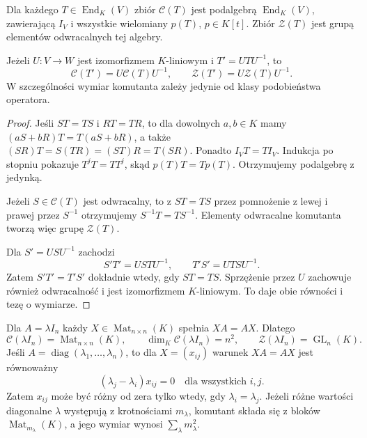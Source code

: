 \begin{stwierdzenie}
\label{prop:lin21-algebra}
Dla każdego \(T\in\operatorname{End}_K(V)\)
zbiór \(\mathcal C(T)\) jest
podalgebrą \(\operatorname{End}_K(V)\),
zawierającą \(I_V\) i wszystkie
wielomiany \(p(T)\), \(p\in K[t]\).
Zbiór \(\mathcal Z(T)\) jest grupą
elementów odwracalnych tej algebry.

Jeżeli \(U\colon V\to W\)
jest izomorfizmem \(K\)-liniowym
i \(T'=UTU^{-1}\), to
\[
 \mathcal C(T')=U\mathcal C(T)U^{-1},
 \qquad
 \mathcal Z(T')=U\mathcal Z(T)U^{-1}.
\]
W szczególności wymiar komutanta
zależy jedynie od klasy podobieństwa
operatora.
\end{stwierdzenie}
\begin{proof}
Jeśli \(ST=TS\) i \(RT=TR\),
to dla dowolnych \(a,b\in K\)
mamy \((aS+bR)T=T(aS+bR)\),
a także
\((SR)T=S(TR)=(ST)R=T(SR)\).
Ponadto \(I_VT=TI_V\).
Indukcja po stopniu pokazuje
\(T^jT=TT^j\), skąd
\(p(T)T=Tp(T)\).
Otrzymujemy podalgebrę z jedynką.

Jeżeli \(S\in\mathcal C(T)\)
jest odwracalny, to z \(ST=TS\)
przez pomnożenie z lewej i prawej
przez \(S^{-1}\) otrzymujemy
\(S^{-1}T=TS^{-1}\).
Elementy odwracalne komutanta
tworzą więc grupę \(\mathcal Z(T)\).

Dla \(S'=USU^{-1}\) zachodzi
\[
 S'T'=USTU^{-1},\qquad
 T'S'=UTSU^{-1}.
\]
Zatem \(S'T'=T'S'\) dokładnie wtedy,
gdy \(ST=TS\).
Sprzężenie przez \(U\) zachowuje
również odwracalność i jest
izomorfizmem \(K\)-liniowym.
To daje obie równości i tezę o wymiarze.
\end{proof}

\begin{przyklad}
\label{prz:lin21-scalar}
Dla \(A=\lambda I_n\) każdy
\(X\in\operatorname{Mat}_{n\times n}(K)\)
spełnia \(XA=AX\).
Dlatego
\[
 \mathcal C(\lambda I_n)
 =\operatorname{Mat}_{n\times n}(K),
 \qquad \dim_K\mathcal C(\lambda I_n)=n^2,
 \qquad \mathcal Z(\lambda I_n)=\operatorname{GL}_n(K).
\]
Jeśli \(A=\operatorname{diag}(\lambda_1,\ldots,\lambda_n)\),
to dla \(X=(x_{ij})\) warunek
\(XA=AX\) jest równoważny
\[
 (\lambda_j-\lambda_i)x_{ij}=0
 \quad\text{dla wszystkich }i,j.
\]
Zatem \(x_{ij}\) może być różny od zera
tylko wtedy, gdy \(\lambda_i=\lambda_j\).
Jeżeli różne wartości diagonalne
\(\lambda\) występują z krotnościami
\(m_\lambda\), komutant składa się
z bloków \(\operatorname{Mat}_{m_\lambda}(K)\),
a jego wymiar wynosi
\(\sum_\lambda m_\lambda^2\).
\end{przyklad}

